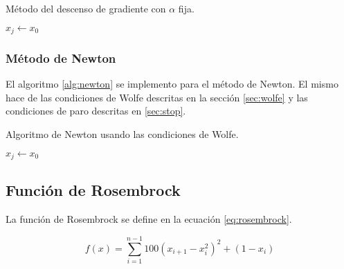 \begin{algorithm}
    \caption{Método del descenso de gradiente con $\alpha$ fija.\label{alg:gradient} }
    $x_j \gets x_0$\\
\end{algorithm}

\subsubsection{Método de Newton}

El algoritmo \ref{alg:newton} se implemento para el método de Newton. El mismo hace de las condiciones de Wolfe descritas en la sección \ref{sec:wolfe} y las condiciones de paro descritas en \ref{sec:stop}.

\begin{algorithm}
    \caption{Algoritmo de Newton usando las condiciones de Wolfe.\label{alg:newton}}
    $x_j \gets x_0$\\
\end{algorithm}

\subsection{Función de Rosembrock}

La función de Rosembrock se define en la ecuación \ref{eq:rosembrock}.

\begin{equation}
    f(x) = \sum_{i=1}^{n-1}  100(x_{i+1}-x_{i}^2)^2 +(1-x_i)
    \label{eq:rosembrock}
\end{equation}

